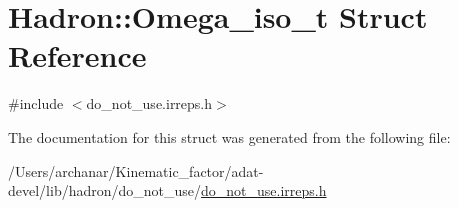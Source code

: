 \hypertarget{structHadron_1_1Omega__iso__t}{}\section{Hadron\+:\+:Omega\+\_\+iso\+\_\+t Struct Reference}
\label{structHadron_1_1Omega__iso__t}


{\ttfamily \#include $<$do\+\_\+not\+\_\+use.\+irreps.\+h$>$}



The documentation for this struct was generated from the following file\+:\begin{DoxyCompactItemize}
\item 
/\+Users/archanar/\+Kinematic\+\_\+factor/adat-\/devel/lib/hadron/do\+\_\+not\+\_\+use/\mbox{\hyperlink{adat-devel_2lib_2hadron_2do__not__use_2do__not__use_8irreps_8h}{do\+\_\+not\+\_\+use.\+irreps.\+h}}\end{DoxyCompactItemize}
